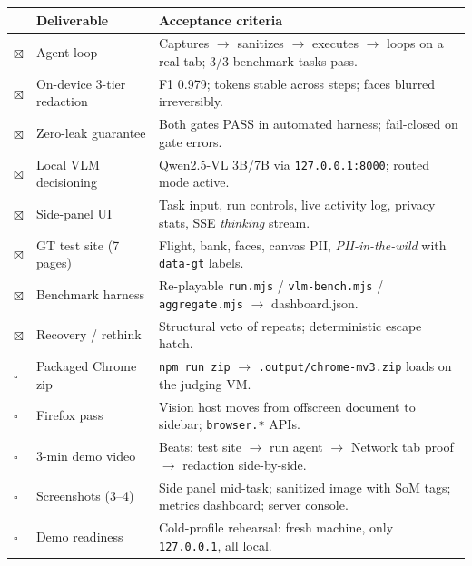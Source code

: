 \documentclass[11pt,a4paper]{article}
\newcommand{\code}[1]{\texttt{#1}}
\newcommand{\good}{\textcolor{good}{$\boxtimes$}}
\newcommand{\todo}{\textcolor{amber}{$\square$}}
\renewcommand{\arraystretch}{1.25}
\begin{document}
\begin{itemize}
\begin{table}[H]
\small
\renewcommand{\arraystretch}{1.3}
\begin{tabularx}{\linewidth}{@{}p{1.1cm}p{5.2cm}X@{}}
\toprule
 & \textbf{Deliverable} & \textbf{Acceptance criteria} \\
\midrule
\good & Agent loop & Captures $\rightarrow$ sanitizes $\rightarrow$ executes $\rightarrow$ loops on a real tab; 3/3 benchmark tasks pass. \\
\good & On-device 3-tier redaction & F1 0.979; tokens stable across steps; faces blurred irreversibly. \\
\good & Zero-leak guarantee & Both gates PASS in automated harness; fail-closed on gate errors. \\
\good & Local VLM decisioning & Qwen2.5-VL 3B/7B via \code{127.0.0.1:8000}; routed mode active. \\
\good & Side-panel UI & Task input, run controls, live activity log, privacy stats, SSE \emph{thinking} stream. \\
\good & GT test site (7 pages) & Flight, bank, faces, canvas PII, \emph{PII-in-the-wild} with \code{data-gt} labels. \\
\good & Benchmark harness & Re-playable \code{run.mjs} / \code{vlm-bench.mjs} / \code{aggregate.mjs} $\rightarrow$ dashboard.json. \\
\good & Recovery / rethink & Structural veto of repeats; deterministic escape hatch. \\
\midrule
\todo & Packaged Chrome zip & \code{npm run zip} $\rightarrow$ \code{.output/chrome-mv3.zip} loads on the judging VM. \\
\todo & Firefox pass & Vision host moves from offscreen document to sidebar; \code{browser.*} APIs. \\
\todo & 3-min demo video & Beats: test site $\rightarrow$ run agent $\rightarrow$ Network tab proof $\rightarrow$ redaction side-by-side. \\
\todo & Screenshots (3--4) & Side panel mid-task; sanitized image with SoM tags; metrics dashboard; server console. \\
\todo & Demo readiness & Cold-profile rehearsal: fresh machine, only \code{127.0.0.1}, all local. \\
\bottomrule
\end{tabularx}
\end{table}


\end{itemize}
\end{document}
